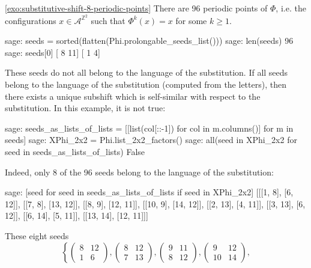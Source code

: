 \documentclass[12pt]{amsart}
\newcommand{\Z}{\mathbb{Z}}
\newcommand{\Acal}{\mathcal{A}} %
\begin{document}
\begin{exosolution}{\ref{exo:substitutive-shift-8-periodic-points}}
There are 96 periodic points of $\Phi$, i.e. the configurations
$x\in\Acal^{\Z^2}$ such that $\Phi^k(x)=x$ for some $k\geq1$.
\begin{sagecommandlinetcb}
\begin{sagecommandline}
sage: seeds = sorted(flatten(Phi.prolongable_seeds_list()))
sage: len(seeds)
96
sage: seeds[0]
[ 8 11]
[ 1  4]
\end{sagecommandline}
\end{sagecommandlinetcb}
These seeds do not all belong to the language of the substitution.
If all seeds belong to the language of the substitution (computed
from the letters), then there exists a unique subshift which is
self-similar with respect to the substitution. In this example, it
is not true:
\begin{sagecommandlinetcb}
\begin{sagecommandline}
sage: seeds_as_lists_of_lists = [[list(col[::-1]) for col in m.columns()] for m in seeds]
sage: XPhi_2x2 = Phi.list_2x2_factors()
sage: all(seed in XPhi_2x2 for seed in seeds_as_lists_of_lists)
False
\end{sagecommandline}
\end{sagecommandlinetcb}
Indeed, only 8 of the 96 seeds belong to the language of the
substitution:
\begin{sagecommandlinetcb}
\begin{sagecommandline}
sage: [seed for seed in seeds_as_lists_of_lists if seed in XPhi_2x2]
[[[1, 8], [6, 12]],
[[7, 8], [13, 12]],
[[8, 9], [12, 11]],
[[10, 9], [14, 12]],
[[2, 13], [4, 11]],
[[3, 13], [6, 12]],
[[6, 14], [5, 11]],
[[13, 14], [12, 11]]]
\end{sagecommandline}
\end{sagecommandlinetcb}
These eight seeds 
\[
    \left\{
        \left(\begin{smallmatrix} 8 & 12  \\ 1 & 6   \end{smallmatrix}\right), 
        \left(\begin{smallmatrix} 8 & 12  \\ 7 & 13  \end{smallmatrix}\right),  
        \left(\begin{smallmatrix} 9 & 11  \\ 8 & 12  \end{smallmatrix}\right),  
        \left(\begin{smallmatrix} 9 & 12  \\ 10 & 14 \end{smallmatrix}\right), 
\]
\end{exosolution}
\end{document}
